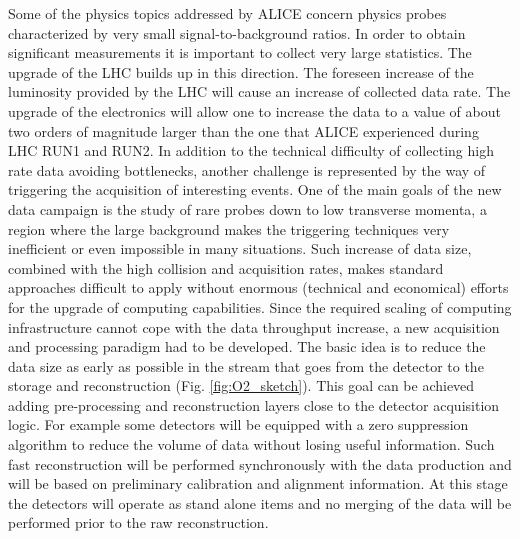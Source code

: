 Some of the physics topics addressed by ALICE concern physics probes characterized by very small signal-to-background ratios.
In order to obtain significant measurements it is important to collect very large statistics.
The upgrade of the LHC builds up in this direction.
The foreseen increase of the luminosity provided by the LHC will cause an increase of collected data rate.
The upgrade of the electronics will allow one to increase the data to a value of about two orders of magnitude larger than the one that ALICE experienced during LHC RUN1 and RUN2.
In addition to the technical difficulty of collecting high rate data avoiding bottlenecks, another challenge is represented by the way of triggering the acquisition of interesting events.
One of the main goals of the new data campaign is the study of rare probes down to low transverse momenta, a region where the large background makes the triggering techniques very inefficient or even impossible in many situations.
Such increase of data size, combined with the high collision and acquisition rates, makes standard approaches difficult to apply without enormous (technical and economical) efforts for the upgrade of computing capabilities.
Since the required scaling of computing infrastructure cannot cope with the data throughput increase, a new acquisition and processing paradigm had to be developed.
The basic idea is to reduce the data size as early as possible in the stream that goes from the detector to the storage and reconstruction (Fig. \ref{fig:O2_sketch}).
This goal can be achieved adding pre-processing and reconstruction layers close to the detector acquisition logic.
For example some detectors will be equipped with a zero suppression algorithm to reduce the volume of data without losing useful information.
Such fast reconstruction will be performed synchronously with the data production and will be based on preliminary calibration and alignment information.
At this stage the detectors will operate as stand alone items and no merging of the data will be performed prior to the raw reconstruction.

